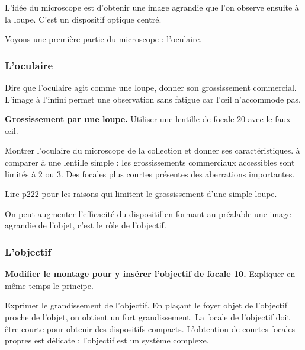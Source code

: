 L'idée du microscope est d'obtenir une image agrandie que l'on observe ensuite à la loupe.
C'est un dispositif optique centré.

\begin{transition}
Voyons une première partie du microscope : l'oculaire.
\end{transition}

\subsubsection{L'oculaire}

Dire que l'oculaire agit comme une loupe, donner son grossissement commercial.
L'image à l'infini permet une observation sans fatigue car l'œil n'accommode pas.

\begin{experience}
\textbf{Grossissement par une loupe.}
Utiliser une lentille de focale \unit{20}{\centi\meter} avec le faux œil.
\end{experience}

Montrer l'oculaire du microscope de la collection et donner ses caractéristiques.
à comparer à une lentille simple : les grossissements commerciaux accessibles sont limités à 2 ou 3.
Des focales plus courtes présentes des aberrations importantes.

\begin{remarque}
Lire \cite{Hecht2002} p222 pour les raisons qui limitent le grossissement d'une simple loupe.
\end{remarque}

\begin{transition}
On peut augmenter l'efficacité du dispositif en formant au préalable une image agrandie de l'objet, c'est le rôle de l'objectif.
\end{transition}

\subsubsection{L'objectif}

\begin{experience}
\textbf{Modifier le montage pour y insérer l'objectif de focale \unit{10}{\centi\meter}.}
Expliquer en même temps le principe.
\end{experience}

Exprimer le grandissement de l'objectif.
En plaçant le foyer objet de l'objectif proche de l'objet, on obtient un fort grandissement.
La focale de l'objectif doit être courte pour obtenir des dispositifs compacts.
L'obtention de courtes focales propres est délicate : l'objectif est un système complexe.

